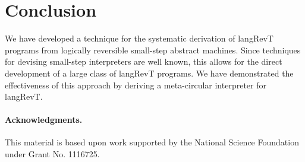 \documentclass{llncs}
\begin{document}



\section{Conclusion}

We have developed a technique for the systematic derivation of
{{langRevT}} programs from logically reversible small-step abstract
machines. Since techniques for devising small-step interpreters are
well known, this allows for the direct development of a large class of
{{langRevT}} programs.  We have demonstrated the effectiveness of this
approach by deriving a meta-circular interpreter for {{langRevT}}.

\paragraph*{Acknowledgments.} 
This material is based upon work supported by the National Science Foundation
under Grant No. 1116725.


\begin{scriptsize}
 
  
\end{scriptsize}
\end{document}
